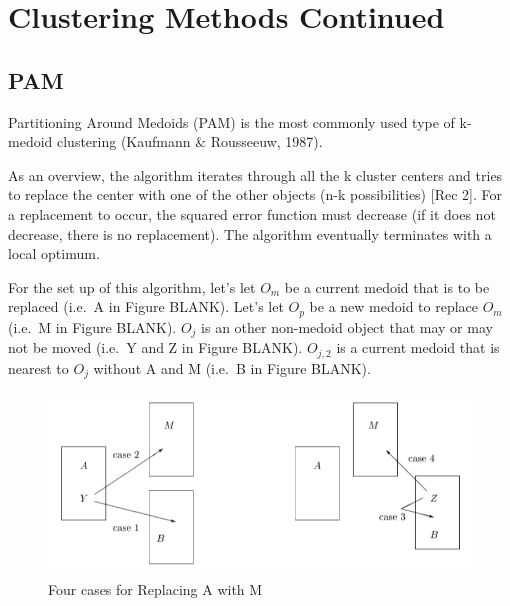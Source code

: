 \documentclass[12pt,twoside]{amherstthesis}
\begin{document}
  \chapter{Clustering Methods Continued}\label{typeset-equ}
  
  \section{PAM}\label{pam}
  
  Partitioning Around Medoids (PAM) is the most commonly used type of
  k-medoid clustering (Kaufmann \& Rousseeuw, 1987).
  
  As an overview, the algorithm iterates through all the k cluster centers
  and tries to replace the center with one of the other objects (n-k
  possibilities) {[}Rec 2{]}. For a replacement to occur, the squared
  error function must decrease (if it does not decrease, there is no
  replacement). The algorithm eventually terminates with a local optimum.
  
  For the set up of this algorithm, let's let \(O_m\) be a current medoid
  that is to be replaced (i.e.~A in Figure BLANK). Let's let \(O_p\) be a
  new medoid to replace \(O_m\) (i.e.~M in Figure BLANK). \(O_j\) is an
  other non-medoid object that may or may not be moved (i.e.~Y and Z in
  Figure BLANK). \(O_{j,2}\) is a current medoid that is nearest to
  \(O_j\) without A and M (i.e.~B in Figure BLANK).
  
  \begin{Shaded}
  \begin{Highlighting}[]
  \NormalTok{(} \NormalTok{, }
         \NormalTok{, }
         \NormalTok{, } \NormalTok{, } \NormalTok{)}
  \end{Highlighting}
  \end{Shaded}
  
  \begin{figure}[htbp]
  \centering
  \includegraphics[scale = 0.5,angle = 0]{PAM_pic.png}
  \caption[Four cases for Replacing A with M]{\normalsize{Four cases for Replacing A with M}}
  \label{fig:PAM}
  \end{figure}
  
\end{document}
